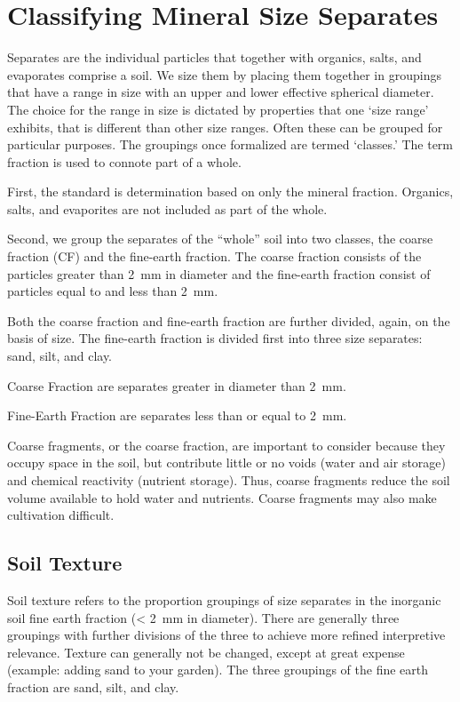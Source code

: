 \documentclass{article}
\begin{document}
\section{Classifying Mineral Size Separates}
    
Separates are the individual particles that together with organics, salts, and evaporates comprise a soil. We size them by placing them together in groupings that have a range in size with an upper and lower effective spherical diameter. The choice for the range in size is dictated by properties that one ‘size range’ exhibits, that is different than other size ranges. Often these can be grouped for particular purposes. The groupings once formalized are termed ‘classes.’ The term fraction is used to connote part of a whole.
    
First, the standard is determination based on only the mineral fraction. Organics, salts, and evaporites are not included as part of the whole.
    
Second, we group the separates of the “whole” soil into two classes, the coarse fraction (CF) and the fine-earth fraction. The coarse fraction consists of the particles greater than \qty{2}{mm} in diameter and the fine-earth fraction consist of particles equal to and less than \qty{2}{mm}.
    
Both the coarse fraction and fine-earth fraction are further divided, again, on the basis of size. The fine-earth fraction is divided first into three size separates: sand, silt, and clay.
    
Coarse Fraction are separates greater in diameter than \qty{2}{mm}.
    
Fine-Earth Fraction are separates less than or equal to \qty{2}{mm}.
    
Coarse fragments, or the coarse fraction, are important to consider because they occupy space in the soil, but contribute little or no voids (water and air storage) and chemical reactivity (nutrient storage). Thus, coarse fragments reduce the soil volume available to hold water and nutrients. Coarse fragments may also make cultivation difficult.

\subsection{Soil Texture}
    
Soil texture refers to the proportion groupings of size separates in the inorganic soil fine earth fraction (\qty{< 2}{mm} in diameter). There are generally three groupings with further divisions of the three to achieve more refined interpretive relevance. Texture can generally not be changed, except at great expense (example: adding sand to your garden). The three groupings of the fine earth fraction are sand, silt, and clay.
    
\end{document}
